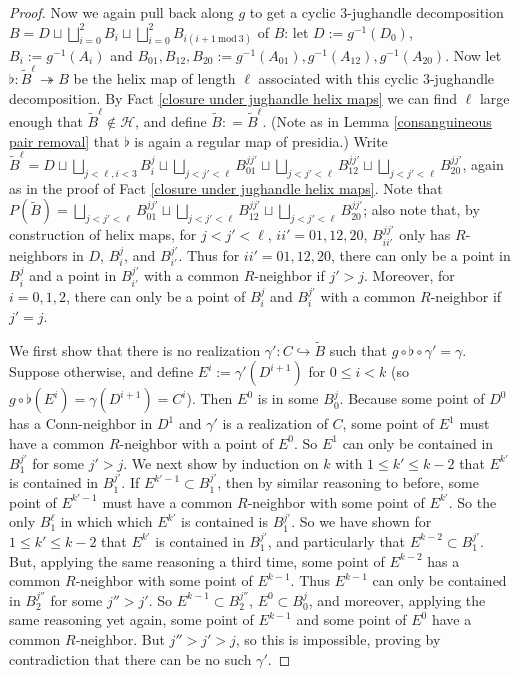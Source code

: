 \documentclass{amsart}
\theoremstyle{definition}
\theoremstyle{remark}
\numberwithin{equation}{section}
\begin{document}
\begin{proof}
     Now we again pull back along $g$ to get a cyclic $3$-jughandle decomposition $B= D \sqcup \bigsqcup^{2}_{i = 0} B_{i} \sqcup \bigsqcup^{2}_{i = 0} B_{i(i+1\mathrm{\:mod\:} 3)}$ of $B$: let $D:=g^{-1}(D_{0})$, $B_{i}:=g^{-1}(A_{i})$ and $B_{01}, B_{12}, B_{20} := g^{-1}(A_{01}),g^{-1}(A_{12}), g^{-1}(A_{20})$. Now let $\flat: \tilde{B}^{\ell} \twoheadrightarrow B$ be the helix map of length $\ell$ associated with this cyclic $3$-jughandle decomposition. By Fact \ref{closure under jughandle helix maps} we can find $\ell$ large enough that $\tilde{B}^{\ell} \notin \mathcal{H}$, and define $\tilde{B} : = \tilde{B}^{\ell}$. (Note as in Lemma \ref{consanguineous pair removal} that $\flat$ is again a regular map of presidia.)  Write $\tilde{B}^{\ell}= D \sqcup \bigsqcup_{j < \ell, i < 3} B^{j}_{i} \sqcup \bigsqcup_{j < j' < \ell} B^{jj'}_{01}\sqcup \bigsqcup_{j < j' < \ell} B_{12}^{jj'} \sqcup \bigsqcup_{j < j' < \ell} B^{jj'}_{20}$, again as in the proof of Fact \ref{closure under jughandle helix maps}. Note that $P(\tilde{B})=   \bigsqcup_{j < j' < \ell} B^{jj'}_{01}\sqcup \bigsqcup_{j < j' < \ell} B_{12}^{jj'} \sqcup \bigsqcup_{j < j' < \ell} B^{jj'}_{20}$; also note that, by construction of helix maps, for $j < j' < \ell$, $ii'=01, 12, 20$, $B^{jj'}_{ii'}$ only has $R$-neighbors in $D$, $B^{j}_{i}$, and $B^{j'}_{i'}$. Thus for $ii'=01, 12, 20$, there can only be a point in $B^{j}_{i}$ and a point in $B^{j'}_{i'}$ with a common $R$-neighbor if $j' > j$. Moreover, for $i = 0, 1, 2$, there can only be a point of $B^{j}_{i}$ and $B^{j'}_{i}$ with a common $R$-neighbor if $j' = j$.


     We first show that there is no realization $\gamma': C \hookrightarrow \tilde{B}$ such that $g \circ \flat \circ \gamma' = \gamma$. Suppose otherwise, and define $E^{i} := \gamma'(D^{i+1}) $ for $0 \leq i < k$ (so $g \circ \flat(E^{i})= \gamma(D^{i+1}) =  C^{i}$). Then $E^{0}$ is in some $B^{j}_{0}$.  Because some point of $D^{0}$ has a $\mathrm{Conn}$-neighbor in $D^{1}$ and $\gamma'$ is a realization of $C$, some point of $E^{1}$ must have a common $R$-neighbor with a point of $E^{0}$.  So $E^{1}$ can only be contained in $B^{j'}_{1}$ for some $j' > j$. We next show by induction on $k$ with $1 \leq k' \leq k-2$ that $E^{k'}$ is contained in $B^{j'}_{1}$. If $E^{k'-1} \subset B^{j'}_{1}$, then by similar reasoning to before, some point of $E^{k'-1}$ must have a common $R$-neighbor with some point of $E^{k'}$. So the only $B^{\ell}_{1}$ in which which $E^{k'}$ is contained is $B^{j'}_{1}$. So we have shown for $1 \leq k' \leq k-2$ that $E^{k'}$ is contained in $B^{j'}_{1}$, and particularly that $E^{k
    -2} \subset B^{j'}_{1}$. But, applying the same reasoning a third time, some point of $E^{k-2}$ has a common $R$-neighbor with some point of $E^{k-1}$. Thus $E^{k-1}$ can only be contained in $B^{j''}_{2}$ for some $j''> j'$.  So $E^{k-1} \subset B^{j''}_{2}$, $E^{0} \subset B^{j}_{0}$, and moreover, applying the same reasoning yet again, some point of $E^{k-1}$ and some point of $E^{0}$ have a common $R$-neighbor. But $j'' > j' > j$, so this is impossible, proving by contradiction that there can be no such $\gamma'$.


\end{proof}
\end{document}

